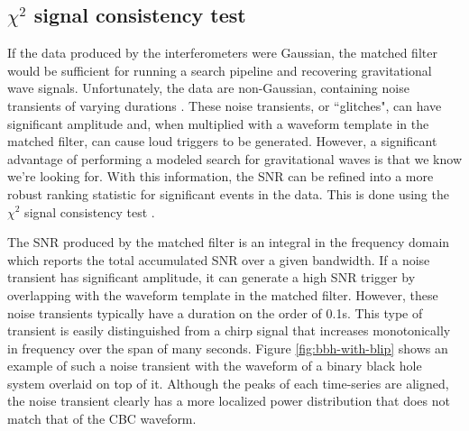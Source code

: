 \subsection{$\chi^{2}$ signal consistency test}\label{sec:chisq}

If the data produced by the interferometers were Gaussian, the matched filter would 
be sufficient for running a search pipeline and recovering gravitational wave signals. 
Unfortunately, the data are non-Gaussian, containing noise transients of varying 
durations \cite{Nuttall:2015dqa,GW150914-DETCHAR}. These noise transients, 
or ``glitches", can have significant amplitude 
and, when multiplied with a waveform template in the matched filter, can cause 
loud triggers to be generated. 
However, a significant advantage of performing a modeled search for gravitational 
waves is that 
we know we're looking for. With this information, the SNR can be refined into a more 
robust ranking statistic for significant events in the data. This is done using the 
$\chi^{2}$ signal consistency test \cite{Allen:2004gu}. 

The SNR produced by the matched filter is an integral in the frequency domain which 
reports the total accumulated SNR over a given bandwidth. If a noise transient has 
significant amplitude, it can generate a high SNR trigger by overlapping with the 
waveform template in the matched filter. However, these noise 
transients typically have a duration on the order of 0.1s. This type of transient 
is easily distinguished from a chirp signal that increases monotonically in frequency 
over the span of many seconds. Figure \ref{fig:bbh-with-blip} shows an example of such 
a noise transient with the waveform of a binary black hole system overlaid on top of it. 
Although the peaks of each time-series are aligned, the noise transient clearly has a more 
localized power distribution that does not match that of the CBC waveform.

